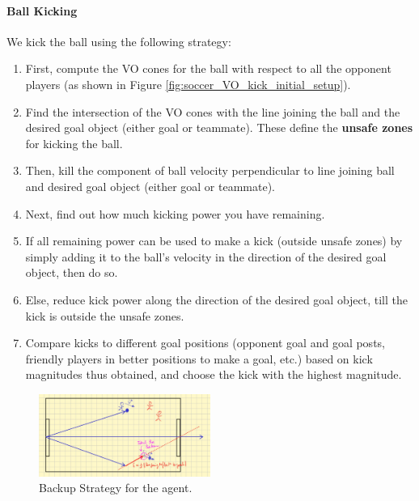 \documentclass[a4paper,12pt]{article}
\begin{document}
\paragraph{Ball Kicking} We kick the ball using the following strategy: 
\begin{enumerate}
  \item First, compute the VO cones for the ball with respect to all the opponent players (as shown in Figure \ref{fig:soccer_VO_kick_initial_setup}).
  
  \item Find the intersection of the VO cones with the line joining the ball and the desired goal object (either goal or teammate). These define the \textbf{unsafe zones} for kicking the ball.
  
  \item Then, kill the component of ball velocity perpendicular to line joining ball and desired goal object (either goal or teammate).
  
  \item Next, find out how much kicking power you have remaining.
  
  \item If all remaining power can be used to make a kick (outside unsafe zones) by simply adding it to the ball's velocity in the direction of the desired goal object, then do so.
  
  \item Else, reduce kick power along the direction of the desired goal object, till the kick is outside the unsafe zones.

  \item Compare kicks to different goal positions (opponent goal and goal posts, friendly players in better positions to make a goal, etc.) based on kick magnitudes thus obtained, and choose the kick with the highest magnitude.  
\end{enumerate}

\begin{figure}[!htpb]
  \centering
  \includegraphics[width=0.5\textwidth]{./figures/soccer_backup.jpg}
  \caption{Backup Strategy for the agent.}
  \label{fig:soccer_backup}
\end{figure}
\end{document}
